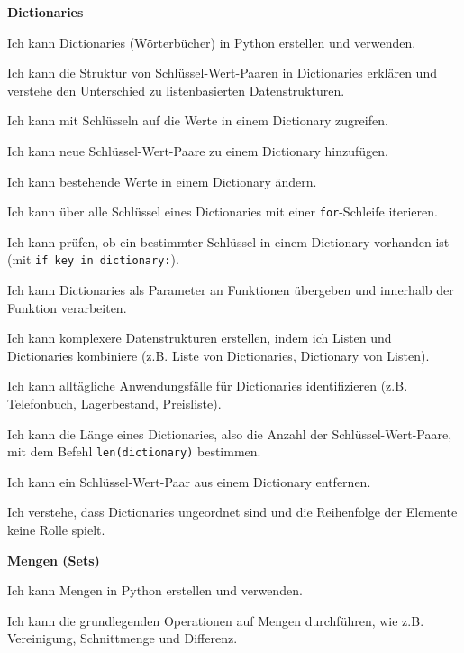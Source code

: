 \begin{todolist}
\begin{todolist}
    \end{todolist}
    \item \textbf{Dictionaries}
    \begin{todolist}
        \item Ich kann Dictionaries (Wörterbücher) in Python erstellen und verwenden.
        \item Ich kann die Struktur von Schlüssel-Wert-Paaren in Dictionaries erklären und verstehe den Unterschied zu listenbasierten Datenstrukturen.
        \item Ich kann mit Schlüsseln auf die Werte in einem Dictionary zugreifen.
        \item Ich kann neue Schlüssel-Wert-Paare zu einem Dictionary hinzufügen.
        \item Ich kann bestehende Werte in einem Dictionary ändern.
        \item Ich kann über alle Schlüssel eines Dictionaries mit einer \lstinline|for|-Schleife iterieren.
        \item Ich kann prüfen, ob ein bestimmter Schlüssel in einem Dictionary vorhanden ist (mit \lstinline|if key in dictionary:|).
        \item Ich kann Dictionaries als Parameter an Funktionen übergeben und innerhalb der Funktion verarbeiten.
        \item Ich kann komplexere Datenstrukturen erstellen, indem ich Listen und Dictionaries kombiniere (z.B. Liste von Dictionaries, Dictionary von Listen).
        \item Ich kann alltägliche Anwendungsfälle für Dictionaries identifizieren (z.B. Telefonbuch, Lagerbestand, Preisliste).
        \item Ich kann die Länge eines Dictionaries, also die Anzahl der Schlüssel-Wert-Paare, mit dem Befehl \lstinline|len(dictionary)| bestimmen.
        \item Ich kann ein Schlüssel-Wert-Paar aus einem Dictionary entfernen.
        \item Ich verstehe, dass Dictionaries ungeordnet sind und die Reihenfolge der Elemente keine Rolle spielt.
    \end{todolist}
    \item \textbf{Mengen (Sets)}
    \begin{todolist}
        \item Ich kann Mengen in Python erstellen und verwenden.
        \item Ich kann die grundlegenden Operationen auf Mengen durchführen, wie z.B. Vereinigung, Schnittmenge und Differenz.

\end{todolist}
\end{todolist}
